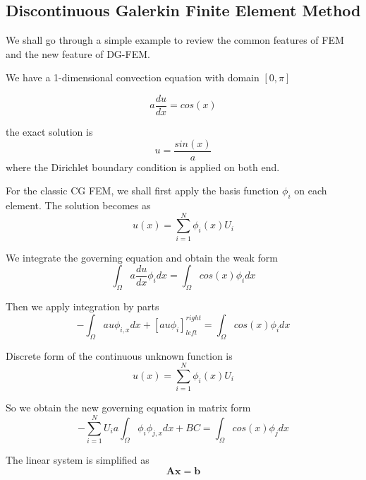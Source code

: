 \subsection{Discontinuous Galerkin Finite Element Method}

We shall go through a simple example to review the common features of FEM and the new feature of DG-FEM.

We have a 1-dimensional convection equation with domain $ [0, \pi] $

\begin{equation}
a \frac{du}{dx} = cos(x)
\end{equation}

the exact solution is
\begin{equation}
u = \frac{sin(x)}{a}
\end{equation}
where the Dirichlet boundary condition is applied on both end.

For the classic CG FEM, we shall first apply the basis function $ \phi_{i} $ on each element. The solution becomes as
\begin{equation}
u(x) = \sum_{i = 1}^{N} \phi_{i} (x) U_{i}
\end{equation}

We integrate the governing equation and obtain the weak form
\begin{equation}
\int_{\Omega} a \frac{du}{dx} \phi_{i} dx = \int_{\Omega} cos(x) \phi_i dx
\end{equation}

Then we apply integration by parts
\begin{equation}
-\int_{\Omega} a u \phi_{i, x} dx + [a u \phi_{i}]^{right}_{left} = \int_{\Omega} cos(x) \phi_{i} dx
\end{equation}

Discrete form of the continuous unknown function is
\begin{equation}
u(x) = \sum_{i = 1}^{N} \phi_{i}(x) U_{i}
\end{equation}

So we obtain the new governing equation in matrix form
\begin{equation}
-\sum_{i = 1}^{N} U_{i} a \int_{\Omega} \phi_{i}\phi_{j,x} dx + BC = \int_{\Omega} cos(x) \phi_{j} dx
\end{equation}

The linear system is simplified as
\begin{equation}
\mathbf{A} \mathbf{x} = \mathbf{b}
\end{equation}

